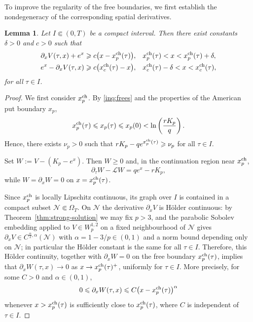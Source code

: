 \documentclass[11pt, a4paper, leqno]{amsart}
\numberwithin{equation}{section}
\theoremstyle{plain}
\newtheorem{lemma}[theorem]{Lemma}
\theoremstyle{definition}
\theoremstyle{remark}
\def\leq{\leqslant}
\def\geq{\geqslant}
\begin{document}
{To improve the regularity of the free boundaries, we first establish
the nondegeneracy of the corresponding spatial derivatives.

\begin{lemma}\label{FB nondeg}
Let $I\Subset(0,T)$ be a compact interval.
Then there exist constants $\delta>0$ and $c>0$ such that
\begin{align}
    \partial_xV(\tau,x)+e^x
    &\geq
    c\bigl(x-x_p^{\rm ch}(\tau)\bigr),
    &&x_p^{\rm ch}(\tau)<x<x_p^{\rm ch}(\tau)+\delta,
    \label{put nondeg}\\
    e^x-\partial_xV(\tau,x)
    &\geq
    c\bigl(x_c^{\rm ch}(\tau)-x\bigr),
    &&x_c^{\rm ch}(\tau)-\delta<x<x_c^{\rm ch}(\tau),
    \label{call nondeg}
\end{align}
for all $\tau\in I$.
\end{lemma}

\begin{proof}
We first consider $x_p^{\rm ch}$. By \eqref{inq:frees} and the
properties of the American put boundary $x_p$,
\[
    x_p^{\rm ch}(\tau)
    \leq x_p(\tau)
    \leq x_p(0)
    <
    \ln\left(\frac{rK_p}{q}\right).
\]
Hence, there exists $\nu_p>0$ such that
$rK_p-qe^{x_p^{\rm ch}(\tau)}\geq\nu_p$ for all $\tau\in I$.

Set $W:=V-(K_p-e^x)$. Then $W\geq0$ and, in the continuation
region near $x_p^{\rm ch}$,
\[
    \partial_\tau W-\mathcal LW=qe^x-rK_p,
\]
while $W=\partial_xW=0$ on $x=x_p^{\rm ch}(\tau)$.

Since $x_p^{\rm ch}$ is locally Lipschitz continuous, its graph over
$I$ is contained in a compact subset $\mathcal N\Subset\Omega_T$.
{
On $\mathcal N$ the derivative $\partial_xV$ is H\"older continuous:
by Theorem~\ref{thm:strong-solution} we may fix $p>3$, and the
parabolic Sobolev embedding \cite[Chapter~II, Lemma~3.3]{LSU68} applied
to $V\in W^{1,2}_p$ on a fixed neighbourhood of $\mathcal N$ gives
$\partial_xV\in C^{\frac{\alpha}{2},\alpha}(\mathcal N)$ with
$\alpha=1-3/p\in(0,1)$ and a norm bound depending only on
$\mathcal N$; in particular the H\"older constant is the same for all
$\tau\in I$.}
Therefore, this H\"older continuity, together with
$\partial_xW=0$ on the free boundary $x_p^{\rm ch}(\tau)$, implies that
$\partial_xW(\tau,x)\to0$ as
$x\to x_p^{\rm ch}(\tau)^+$, uniformly for $\tau\in I$.
More precisely, for some $C>0$ and $\alpha\in(0,1)$,
\[
    0\leq\partial_xW(\tau,x)
    \leq C\bigl(x-x_p^{\rm ch}(\tau)\bigr)^\alpha
\]
whenever $x>x_p^{\rm ch}(\tau)$ is sufficiently close to
$x_p^{\rm ch}(\tau)$, where $C$ is independent of $\tau\in I$.


\end{proof}}
\end{document}
